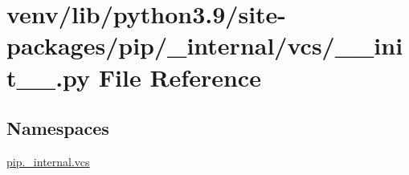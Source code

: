 \hypertarget{venv_2lib_2python3_89_2site-packages_2pip_2__internal_2vcs_2____init_____8py}{}\section{venv/lib/python3.9/site-\/packages/pip/\+\_\+internal/vcs/\+\_\+\+\_\+init\+\_\+\+\_\+.py File Reference}
\label{venv_2lib_2python3_89_2site-packages_2pip_2__internal_2vcs_2____init_____8py}
\subsection*{Namespaces}
\begin{DoxyCompactItemize}
\item 
 \hyperlink{namespacepip_1_1__internal_1_1vcs}{pip.\+\_\+internal.\+vcs}
\end{DoxyCompactItemize}
